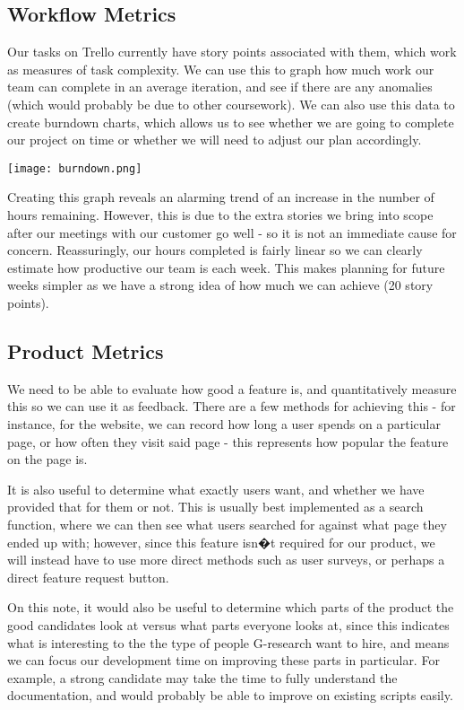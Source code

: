 \subsection{Workflow Metrics}
Our tasks on Trello currently have story points associated with them, which work as measures of task complexity. We can use this to graph how much work our team can complete in an average iteration, and see if there are any anomalies (which would probably be due to other coursework). We can also use this data to create burndown charts, which allows us to see whether we are going to complete our project on time or whether we will need to adjust our plan accordingly. 

\begin{center}
\texttt{[image: burndown.png]}
\end{center}

Creating this graph reveals an alarming trend of an increase in the number of hours remaining. However, this is due to the extra stories we bring into scope after our meetings with our customer go well - so it is not an immediate cause for concern. Reassuringly, our hours completed is fairly linear so we can clearly estimate how productive our team is each week. This makes planning for future weeks simpler as we have a strong idea of how much we can achieve (20 story points).

\subsection{Product Metrics}
We need to be able to evaluate how good a feature is, and quantitatively measure this so we can use it as feedback. There are a few methods for achieving this - for instance, for the website, we can record how long a user spends on a particular page, or how often they visit said page - this represents how popular the feature on the page is. 

It is also useful to determine what exactly users want, and whether we have provided that for them or not. This is usually best implemented as a search function, where we can then see what users searched for against what page they ended up with; however, since this feature isn�t required for our product, we will instead have to use more direct methods such as user surveys, or perhaps a direct feature request button.

On this note, it would also be useful to determine which parts of the product the good candidates look at versus what parts everyone looks at, since this indicates what is interesting to the the type of people G-research want to hire, and means we can focus our development time on improving these parts in particular. For example, a strong candidate may take the time to fully understand the documentation, and would probably be able to improve on existing scripts easily.


